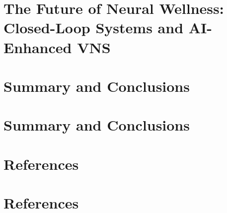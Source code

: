 \documentclass[
  Letterpaper,
]{scrbook}
\begin{document}

\chapter{The Future of Neural Wellness: Closed-Loop Systems and
AI-Enhanced
VNS}\label{the-future-of-neural-wellness-closed-loop-systems-and-ai-enhanced-vns-1}


\chapter{Summary and Conclusions}\label{summary-and-conclusions}


\chapter{Summary and Conclusions}\label{summary-and-conclusions-1}


\chapter{References}\label{references}


\chapter*{References}\label{references-1}

\end{document}
